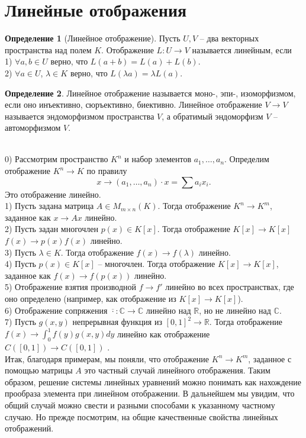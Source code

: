 \documentclass[10pt,a4paper,oneside]{book} %
\theoremstyle{definition}
\newtheorem*{defn}{Определение}
\newcommand{\mb}[1]{\mathbb{#1}}
\newcommand{\ovl}{\overline}
\def\exm{\noindent {\bf Примеры:}}
\def\dfn{\begin{defn}}
\def\edfn{\end{defn}}
\begin{document}
\section{Линейные отображения}

\dfn[Линейное отображение] Пусть $U,V$ -- два векторных пространства над полем $K$. Отображение $L\colon U \to V$ называется линейным, если\\
1) $\forall a,b \in U$ верно, что $L(a+b)=L(a)+L(b)$.\\
2) $\forall a \in U$, $\lambda \in K$ верно, что $L(\lambda a)=\lambda L(a)$.
\edfn

\dfn Линейное отображение называется моно-, эпи-, изоморфизмом, если оно инъективно, сюръективно, биективно. Линейное отображение $V \to V$ называется эндоморфизмом пространства $V$, а обратимый эндоморфизм $V$ -- автоморфизмом $V$.
\edfn

\exm\\
0) Рассмотрим пространство $K^n$ и набор элементов $a_1,\dots,a_n$. Определим отображение $K^n \to K$ по правилу $$x \to (a_1,\dots, a_n) \cdot x= \sum a_ix_i.$$
Это отображение линейно.\\
1) Пусть задана матрица $A \in M_{m\times n}(K)$. Тогда отображение $K^n \to K^m$, заданное как $x \to Ax$ линейно.\\
2) Пусть задан многочлен $p(x) \in K[x]$. Тогда отображение $K[x] \to K[x]$ $f(x)\to p(x)f(x)$ линейно.\\
3) Пусть $\lambda \in K$. Тогда отображение $f(x) \to f(\lambda)$ линейно.\\
4) Пусть $p(x) \in K[x]$ -- многочлен. Тогда отображение $K[x] \to K[x]$, заданное как  $f(x)\to f(p(x))$ линейно.\\
5) Отображение взятия производной $f \to f'$ линейно во всех пространствах, где оно определено (например, как отображение из $K[x] \to K[x]$).\\
6) Отображение сопряжения $\ovl{\cdot} \colon \mb C \to \mb C$ линейно над $\mb R$, но не линейно над $\mb C$.\\
7) Пусть $g(x,y)$ непрерывная функция из $[0,1]^2 \to \mb R$. Тогда отображение $f(x) \to \int_{0}^1 f(y)g(x,y)dy$ линейно  как отображение $C([0,1])\to C([0,1])$ .\\




Итак, благодаря примерам, мы поняли, что отображение $K^n \to K^m$, заданное с помощью матрицы $A$ это частный случай линейного отображения. Таким образом, решение системы линейных уравнений можно понимать как нахождение прообраза элемента при линейном отображении. В дальнейшем мы увидим, что общий случай можно свести  и разными способами к указанному частному случаю. Но прежде посмотрим, на общие качественные свойства линейных отображений.
\end{document}
